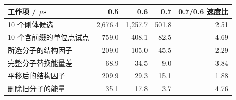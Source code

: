 \begin{center}\small\begin{tabular}{@{}lrrrr@{}}\toprule
工作项 / $\mu$s & 0.5 & 0.6 & 0.7 & 0.7/0.6 速度比\\\midrule
10 个刚体候选 & 2,676.4 & 1,257.7 & 501.8 & 2.51\\
10 个含前缀的单位点试点 & 759.0 & 408.1 & 82.5 & 4.69\\
所选分子的结构因子 & 209.0 & 105.0 & 45.5 & 2.29\\
完整分子替换能量差 & 68.9 & 34.5 & 9.0 & 3.84\\
平移后的结构因子 & 209.9 & 29.3 & 15.1 & 1.88\\
删除旧分子的能量 & 35.1 & 17.8 & 3.7 & 4.76\\
\bottomrule\end{tabular}\end{center}
